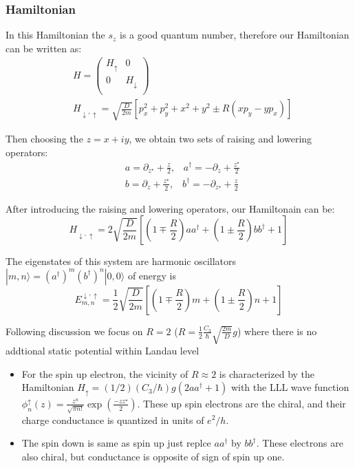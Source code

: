 \documentclass{beamer}
\begin{document}
\begin{frame}
\frametitle{Hamiltonian}
 In this Hamiltonian the $s_z$ is a good quantum number, therefore our
 Hamiltonian can be written as:
\begin{eqnarray*}
& H = \left(%
\begin{array}{cc}
  H_{\uparrow} & 0 \\
  0 & H_{\downarrow} \\
\end{array}%
\right) \nonumber\\ & H_{ \downarrow , \uparrow} =
\sqrt{\frac{D}{2m}} [p_x^2 + p_y^2 + x^2+ y^2 \pm R(x p_y - y p_x)]
\end{eqnarray*}

Then choosing the $z = x+ i y$, we obtain two
sets of raising and lowering operators:
\begin{eqnarray*}
& a = \partial_{z^\star} + \frac{z}{2}, \;\;\; a^\dagger = - \partial_z + \frac{z^\star}{2} \nonumber \\
& b = \partial_{z} + \frac{z^\star}{2}, \;\;\; b^\dagger = -
\partial_{z^\star} + \frac{z}{2}
\end{eqnarray*}
\end{frame}

\begin{frame}
After introducing the raising and lowering operators, our Hamiltonain can
be:
\begin{equation*}
H_{\downarrow, \uparrow} =2 \sqrt{\frac{D}{2m}} \left[(1 \mp
\frac{R}{2} ) a a^\dagger + (1 \pm \frac{R}{2}) b b^\dagger  + 1
\right]
\end{equation*}

The eigenstates of this system are harmonic oscillators
$|m,n\rangle = (a^\dagger)^m (b^\dagger)^n |0,0\rangle$ of energy is
\begin{equation*}
  E^{\downarrow, \uparrow}_{m,n} = \frac{1}{2} \sqrt{\frac{D}{2m}}
\left[(1 \mp \frac{R}{2} ) m + (1 \pm \frac{R}{2}) n + 1 \right]
\end{equation*}

Following discussion we focus on $R = 2$ ($R =
\frac{1}{2} \frac{C_3}{\hbar} \sqrt{\frac{2m}{D}} g$) where there is no 
addtional static potential within Landau level
\end{frame}

\begin{frame}
\begin{itemize} 
  \item For the spin up electron, the vicinity of $R \approx 2$ is 
characterized by the Hamiltonian $H_{\uparrow} = (1/2)(C_3/\hbar) g (2 a a^\dagger + 1) $ 
with the LLL wave function
$\phi^\uparrow_n(z) =\frac{z^n}{\sqrt{\pi n! } }\exp(\frac{-z
z^\star}{2})$. These up spin electrons
are the chiral, and their charge conductance is quantized in units
of $e^2/h$.
\item The spin down is same as spin up just replce $a a^\dagger$ by
  $bb^\dagger$. These electrons are also chiral, but conductance is opposite
  of sign of spin up one.
\end{itemize}
\end{frame}
\end{document}

